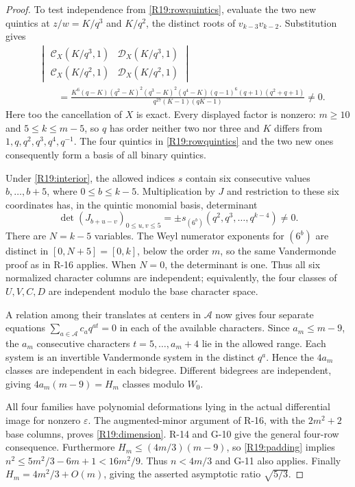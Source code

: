 \documentclass[11pt,a4paper]{article}
\theoremstyle{definition}\newtheorem{definition}{Definition}
\begin{document}
\begin{proof}
To test independence from \eqref{R19:rowquintics},
evaluate the two new quintics at
$z/w=K/q^3$ and $K/q^2$, the distinct roots of
$v_{k-3}v_{k-2}$. Substitution gives
\begin{equation}\label{R19:evaldet}
\begin{aligned}
 &\begin{vmatrix}
 \mathcal C_X(K/q^3,1)&\mathcal D_X(K/q^3,1)\\
 \mathcal C_X(K/q^2,1)&\mathcal D_X(K/q^2,1)
 \end{vmatrix}\\
 &\qquad=
 \frac{K^6(q-K)(q^2-K)^2(q^3-K)^2(q^4-K)
             (q-1)^6(q+1)(q^2+q+1)}
      {q^{27}(K-1)(qK-1)}\ne0.
\end{aligned}
\end{equation}
Here too the cancellation of $X$ is exact.
Every displayed factor is nonzero: $m\geq10$ and
$5\leq k\leq m-5$, so $q$ has order neither two nor
three and $K$ differs from $1,q,q^2,q^3,q^4,q^{-1}$.
The four quintics in \eqref{R19:rowquintics} and the
two new ones consequently form a basis of all binary
quintics.

Under \eqref{R19:interior}, the allowed indices $s$
contain six consecutive values $b,\ldots,b+5$, where
$0\leq b\leq k-5$. Multiplication by $J$ and restriction
to these six coordinates has, in the quintic monomial
basis, determinant
\[
 \det(J_{b+u-v})_{0\leq u,v\leq5}
   =\pm s_{(6^b)}(q^2,q^3,\ldots,q^{k-4})\ne0.
\]
There are $N=k-5$ variables. The Weyl numerator
exponents for $(6^b)$ are distinct in
$[0,N+5]=[0,k]$, below the order $m$, so the same
Vandermonde proof as in R-16 applies. When $N=0$,
the determinant is one. Thus all six normalized
character columns are independent; equivalently,
the four classes of $U,V,C,D$ are independent modulo
the base character space.

A relation among their translates at centers in
$\mathcal A$ now gives four separate equations
$\sum_{a\in\mathcal A}c_aq^{at}=0$ in each of the
available characters. Since $a_m\leq m-9$, the
$a_m$ consecutive characters
$t=5,\ldots,a_m+4$ lie in the allowed range.
Each system is an invertible Vandermonde system in
the distinct $q^a$. Hence the $4a_m$ classes are
independent in each bidegree. Different bidegrees
are independent, giving $4a_m(m-9)=H_m$ classes
modulo $W_0$.

All four families have polynomial deformations lying
in the actual differential image for nonzero
$\varepsilon$. The augmented-minor argument of
R-16, with the $2m^2+2$ base columns, proves
\eqref{R19:dimension}.
R-14 and G-10 give the general four-row consequence.
Furthermore $H_m\leq(4m/3)(m-9)$, so
\eqref{R19:padding} implies
$n^2\leq5m^2/3-6m+1<16m^2/9$.
Thus $n<4m/3$ and G-11 also applies.
Finally $H_m=4m^2/3+O(m)$, giving the asserted
asymptotic ratio $\sqrt{5/3}$.
\end{proof}
\end{document}
